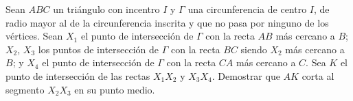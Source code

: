 Sean $ABC$ un triángulo con incentro $I$ y $\Gamma$ una circunferencia de centro $I$, de radio mayor al de la circunferencia inscrita y que no pasa por ninguno de los vértices. Sean $X_1$ el punto de intersección de $\Gamma$ con la recta $AB$ más cercano a $B$; $X_2$, $X_3$ los puntos de intersección de $\Gamma$ con la recta $BC$ siendo $X_2$ más cercano a $B$; y $X_4$ el punto de intersección de $\Gamma$ con la recta $CA$ más cercano a $C$. Sea $K$ el punto de intersección de las rectas $X_1 X_2$ y $X_3 X_4$. Demostrar que $AK$ corta al segmento $X_2 X_3$ en su punto medio.
